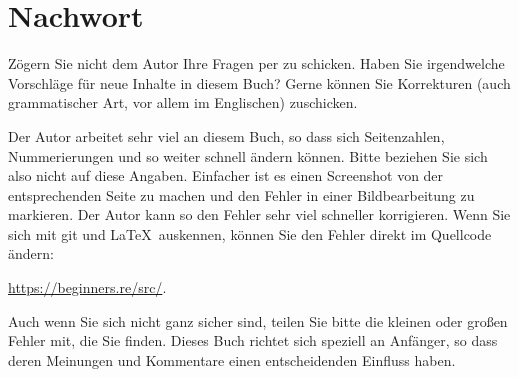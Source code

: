 \part*{Nachwort}


Zögern Sie nicht dem Autor Ihre Fragen per \GTT{\EMAILS} zu schicken.
Haben Sie irgendwelche Vorschläge für neue Inhalte in diesem Buch?
Gerne können Sie Korrekturen (auch grammatischer Art, vor allem im Englischen) zuschicken.

Der Autor arbeitet sehr viel an diesem Buch, so dass sich Seitenzahlen, Nummerierungen und so weiter
schnell ändern können. Bitte beziehen Sie sich also nicht auf diese Angaben.
Einfacher ist es einen Screenshot von der entsprechenden Seite zu machen und den Fehler in einer Bildbearbeitung
zu markieren. Der Autor kann so den Fehler sehr viel schneller korrigieren.
Wenn Sie sich mit git und \LaTeX\ auskennen, können Sie den Fehler direkt im Quellcode ändern:

\url{https://beginners.re/src/}.

Auch wenn Sie sich nicht ganz sicher sind, teilen Sie bitte die kleinen oder großen Fehler mit, die Sie finden.
Dieses Buch richtet sich speziell an Anfänger, so dass deren Meinungen und Kommentare einen entscheidenden Einfluss haben.
